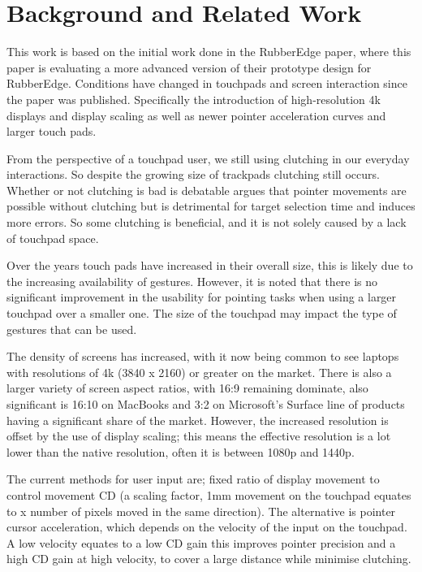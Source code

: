 \section{Background and Related Work}

This work is based on the initial work done in the RubberEdge paper\cite{Casiez2007RubberEdge}, where this paper is evaluating a more advanced version of their prototype design for RubberEdge. Conditions have changed in touchpads and screen interaction since the paper was published. Specifically the introduction of high-resolution 4k displays and display scaling as well as newer pointer acceleration curves and larger touch pads.

From the perspective of a touchpad user, we still using clutching in our everyday interactions. So despite the growing size of trackpads clutching still occurs. Whether or not clutching is bad is debatable \cite{Nancel2015ClutchingEnemy} argues that pointer movements are possible without clutching but is detrimental for target selection time and induces more errors. So some clutching is beneficial, and it is not solely caused by a lack of touchpad space.

Over the years touch pads have increased in their overall size, this is likely due to the increasing availability of gestures. However, it is noted that there is no significant improvement in the usability for pointing tasks when using a larger touchpad over a smaller one\cite{Avera2016EffectsPerformance}. The size of the touchpad may impact the type of gestures that can be used.

The density of screens has increased, with it now being common to see laptops with resolutions of 4k (3840 x 2160) or greater on the market. There is also a larger variety of screen aspect ratios, with 16:9 remaining dominate, also significant is 16:10 on MacBooks\cite{MacBookProNZ} and 3:2 on Microsoft's Surface\cite{SurfaceBeauty} line of products having a significant share of the market. However, the increased resolution is offset by the use of display scaling; this means the effective resolution is a lot lower than the native resolution, often it is between 1080p and 1440p.

The current methods for user input are; fixed ratio of display movement to control movement \gls{CD} (a scaling factor, 1mm movement on the touchpad equates to x number of pixels moved in the same direction). The alternative is pointer cursor acceleration, which depends on the velocity of the input on the touchpad. A low velocity equates to a low \gls{CD} gain this improves pointer precision and a high \gls{CD} gain at high velocity, to cover a large distance while minimise clutching.

